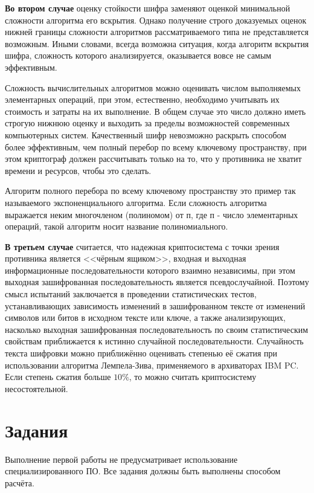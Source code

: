 \noindent \textbf{Во втором случае} оценку стойкости шифра заменяют оценкой
минимальной сложности алгоритма его вскрытия. Однако получение строго
доказуемых оценок нижней границы сложности алгоритмов рассматриваемого типа
не представляется возможным. Иными словами, всегда возможна ситуация, когда
алгоритм вскрытия шифра, сложность которого анализируется, оказывается вовсе
не самым эффективным.

Сложность вычислительных алгоритмов можно оценивать числом выполняемых
элементарных операций, при этом, естественно, необходимо учитывать их
стоимость и затраты на их выполнение. В общем случае это число должно иметь
строгую нижнюю оценку и выходить за пределы возможностей современных
компьютерных систем. Качественный шифр невозможно раскрыть способом более
эффективным, чем полный перебор по всему ключевому пространству, при этом
криптограф должен рассчитывать только на то, что у противника не хватит
времени и ресурсов, чтобы это сделать.

Алгоритм полного перебора по всему ключевому пространству это пример так
называемого экспоненциального алгоритма. Если сложность алгоритма выражается
неким многочленом (полиномом) от п, где п - число элементарных операций,
такой алгоритм носит название полиномиального.

\noindent \textbf{В третьем случае} считается, что надежная криптосистема с
точки зрения противника
 является <<чёрным ящиком>>, входная и выходная информационные последовательности
которого взаимно независимы, при этом выходная зашифрованная последовательность
является псевдослучайной. Поэтому смысл испытаний заключается в проведении статистических
 тестов, устанавливающих зависимость изменений в зашифрованном тексте от изменений
 символов или битов в исходном тексте или ключе, а также анализирующих, насколько
 выходная зашифрованная последовательность по своим статистическим свойствам
приближается к истинно случайной последовательности. Случайность текста шифровки
 можно приближённо оценивать степенью её сжатия при использовании алгоритма Лемпела-Зива,
 применяемого в архиваторах IBM PC. Если степень сжатия больше $10\%$, то можно
 считать криптосистему несостоятельной.

\section{Задания}\label{sect1_b}
Выполнение первой работы не предусматривает использование специализированного
ПО. Все задания должны быть выполнены способом расчёта.

